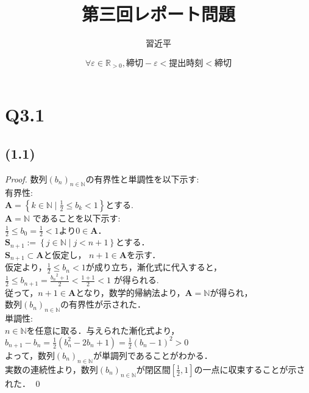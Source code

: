 \documentclass{jarticle}
\begin{document}
\title{第三回レポート問題}
\author{習近平}
\date{$\forall \varepsilon \in \mathbb{R}_{ > 0}, 締切-\varepsilon <提出時刻<締切$}
\maketitle
\section*{Q3.1}
\subsection*{(1.1)}
\begin{proof}
\noindent 数列$(b_{n})_{n\in \mathbb{N}}$の有界性と単調性を以下示す:
\\
\noindent 有界性: \\
\noindent $ \mathbf{A} = \left\{k \in \mathbb{N} \mid \frac{1}{2} \le b_{k} <1 \right\}$とする.\\
$ \mathbf{A} = \mathbb{N}$ であることを以下示す: \\
$ \frac{1}{2} \le b_{0}= \frac{1}{2} < 1 $より$0 \in \mathbf{A}$．\\
$ \mathbf{S}_{n+1} := \left\{j \in \mathbb{N} \mid j < n+1 \right\}$とする． \\
$ \mathbf{S}_{n+1} \subset \mathbf{A} $と仮定し， $n+1 \in \mathbf{A} $を示す．\\
仮定より，$ \frac{1}{2} \le b_{n} < 1 $が成り立ち，漸化式に代入すると，\\
$\frac{1}{2} \le b_{n+1}= \frac{{b_{n}}^2+1}{2}< \frac{1+1}{2} < 1$ が得られる.\\
従って，$n+1 \in \mathbf{A} $となり，数学的帰納法より，$ \mathbf{A} = \mathbb{N}$が得られ，\\
数列$(b_{n})_{n\in \mathbb{N}}$の有界性が示された．\\

\noindent 単調性:\\
$n \in \mathbb{N}$を任意に取る．与えられた漸化式より，\\
$ b_{n+1}-b_{n} = \frac{1}{2} (b_{n}^{2} - 2b_{n} +1) =\frac{1}{2} (b_{n} -1)^{2} >0 $\\
よって，数列$(b_{n})_{n\in \mathbb{N}}$が単調列であることがわかる．\\

\noindent 実数の連続性より，数列$(b_{n})_{n\in \mathbb{N}}$が閉区間$[ \frac{1}{2} , 1]$の一点に収束することが示された．
\qed
\end{proof}
\end{document}
